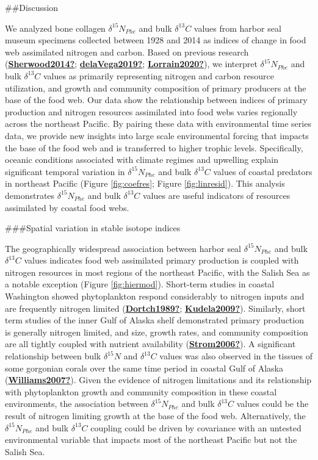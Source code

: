 \documentclass [11pt, proquest] {uwthesis}[2015/03/03]
\begin{document}
\#\#Discussion

We analyzed bone collagen \(\delta^{15}N_{Phe}\) and bulk \(\delta^{13}C\) values from harbor seal museum specimens collected between 1928 and 2014 as indices of change in food web assimilated nitrogen and carbon. Based on previous research (\protect\hyperlink{ref-Sherwood2014}{\textbf{Sherwood2014?}}; \protect\hyperlink{ref-delaVega2019}{\textbf{delaVega2019?}}; \protect\hyperlink{ref-Lorrain2020}{\textbf{Lorrain2020?}}), we interpret \(\delta^{15}N_{Phe}\) and bulk \(\delta^{13}C\) values as primarily representing nitrogen and carbon resource utilization, and growth and community composition of primary producers at the base of the food web. Our data show the relationship between indices of primary production and nitrogen resources assimilated into food webs varies regionally across the northeast Pacific. By pairing these data with environmental time series data, we provide new insights into large scale environmental forcing that impacts the base of the food web and is transferred to higher trophic levels. Specifically, oceanic conditions associated with climate regimes and upwelling explain significant temporal variation in \(\delta^{15}N_{Phe}\) and bulk \(\delta^{13}C\) values of coastal predators in northeast Pacific (Figure \ref{fig:coefres}; Figure \ref{fig:linresid}). This analysis demonstrates \(\delta^{15}N_{Phe}\) and bulk \(\delta^{13}C\) values are useful indicators of resources assimilated by coastal food webs.

\#\#\#Spatial variation in stable isotope indices

The geographically widespread association between harbor seal \(\delta^{15}N_{Phe}\) and bulk \(\delta^{13}C\) values indicates food web assimilated primary production is coupled with nitrogen resources in most regions of the northeast Pacific, with the Salish Sea as a notable exception (Figure \ref{fig:hiermod}). Short-term studies in coastal Washington showed phytoplankton respond considerably to nitrogen inputs and are frequently nitrogen limited (\protect\hyperlink{ref-Dortch1989}{\textbf{Dortch1989?}}; \protect\hyperlink{ref-Kudela2009}{\textbf{Kudela2009?}}). Similarly, short term studies of the inner Gulf of Alaska shelf demonstrated primary production is generally nitrogen limited, and size, growth rates, and community composition are all tightly coupled with nutrient availability (\protect\hyperlink{ref-Strom2006}{\textbf{Strom2006?}}). A significant relationship between bulk \(\delta^{15}N\) and \(\delta^{13}C\) values was also observed in the tissues of some gorgonian corals over the same time period in coastal Gulf of Alaska (\protect\hyperlink{ref-Williams2007}{\textbf{Williams2007?}}). Given the evidence of nitrogen limitations and its relationship with phytoplankton growth and community composition in these coastal environments, the association between \(\delta^{15}N_{Phe}\) and bulk \(\delta^{13}C\) values could be the result of nitrogen limiting growth at the base of the food web. Alternatively, the \(\delta^{15}N_{Phe}\) and bulk \(\delta^{13}C\) coupling could be driven by covariance with an untested environmental variable that impacts most of the northeast Pacific but not the Salish Sea.
\end{document}
